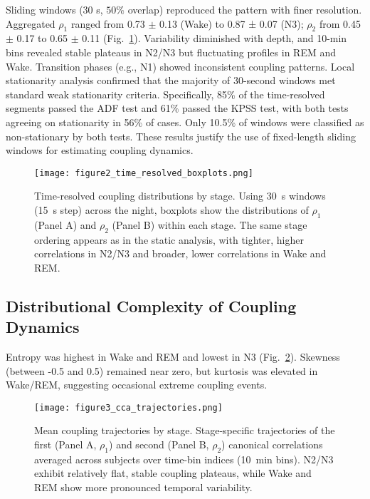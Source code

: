 Sliding windows (30 s, $50\%$ overlap) reproduced the pattern with finer resolution. Aggregated $\rho_1$ ranged from 0.73 $\pm$ 0.13 (Wake) to 0.87 ± 0.07 (N3); $\rho_2$ from 0.45 $\pm$ 0.17 to 0.65 $\pm$ 0.11 (Fig.~\ref{fig:figure2}). Variability diminished with depth, and 10-min bins revealed stable plateaus in N2/N3 but fluctuating profiles in REM and Wake. Transition phases (e.g., N1) showed inconsistent coupling patterns.
Local stationarity analysis confirmed that the majority of 30-second windows met standard weak stationarity criteria. Specifically, 85\% of the time-resolved segments passed the ADF test and 61\% passed the KPSS test, with both tests agreeing on stationarity in 56\% of cases. Only 10.5\% of windows were classified as non-stationary by both tests. These results justify the use of fixed-length sliding windows for estimating coupling dynamics.%
\begin{figure}[!t]
\centering
\texttt{[image: figure2\_time\_resolved\_boxplots.png]}%
\caption{Time-resolved coupling distributions by stage. Using 30~s windows (15~s step) across the night, boxplots show the distributions of $\rho_1$ (Panel A) and $\rho_2$ (Panel B) within each stage. The same stage ordering appears as in the static analysis, with tighter, higher correlations in N2/N3 and broader, lower correlations in Wake and REM.}\label{fig:figure2}
\end{figure}%

\subsection{Distributional Complexity of Coupling Dynamics}

Entropy was highest in Wake and REM and lowest in N3 (Fig.~\ref{fig:figure3}). Skewness (between -0.5 and 0.5) remained near zero, but kurtosis was elevated in Wake/REM, suggesting occasional extreme coupling events.%
\begin{figure}[!t]
\centering
\texttt{[image: figure3\_cca\_trajectories.png]}%
\caption{Mean coupling trajectories by stage. Stage-specific trajectories of the first (Panel A, $\rho_1$) and second (Panel B, $\rho_2$) canonical correlations averaged across subjects over time-bin indices (10~min bins). N2/N3 exhibit relatively flat, stable coupling plateaus, while Wake and REM show more pronounced temporal variability.}\label{fig:figure3}
\end{figure}%

